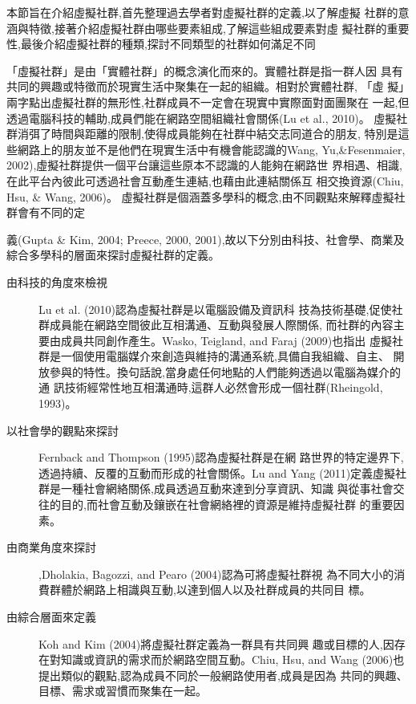 


本節旨在介紹虛擬社群,首先整理過去學者對虛擬社群的定義,以了解虛擬
社群的意涵與特徵,接著介紹虛擬社群由哪些要素組成,了解這些組成要素對虛
擬社群的重要性,最後介紹虛擬社群的種類,探討不同類型的社群如何滿足不同


「虛擬社群」是由「實體社群」的概念演化而來的。實體社群是指一群人因
具有共同的興趣或特徵而於現實生活中聚集在一起的組織。相對於實體社群,
「虛
擬」兩字點出虛擬社群的無形性,社群成員不一定會在現實中實際面對面團聚在
一起,但透過電腦科技的輔助,成員們能在網路空間組織社會關係(Lu et al., 2010)。
虛擬社群消弭了時間與距離的限制,使得成員能夠在社群中結交志同道合的朋友,
特別是這些網路上的朋友並不是他們在現實生活中有機會能認識的Wang, Yu,\&Fesenmaier, 2002),虛擬社群提供一個平台讓這些原本不認識的人能夠在網路世
界相遇、相識,在此平台內彼此可透過社會互動產生連結,也藉由此連結關係互
相交換資源(Chiu, Hsu, \& Wang, 2006)。
虛擬社群是個涵蓋多學科的概念,由不同觀點來解釋虛擬社群會有不同的定


義(Gupta \& Kim, 2004; Preece, 2000, 2001),故以下分別由科技、社會學、商業及
綜合多學科的層面來探討虛擬社群的定義。

\begin{description}
\item[由科技的角度來檢視] Lu et al. (2010)認為虛擬社群是以電腦設備及資訊科
技為技術基礎,促使社群成員能在網路空間彼此互相溝通、互動與發展人際關係,
而社群的內容主要由成員共同創作產生。Wasko, Teigland, and Faraj (2009)也指出
虛擬社群是一個使用電腦媒介來創造與維持的溝通系統,具備自我組織、自主、
開放參與的特性。換句話說,當身處任何地點的人們能夠透過以電腦為媒介的通
訊技術經常性地互相溝通時,這群人必然會形成一個社群(Rheingold, 1993)。
\item[以社會學的觀點來探討] Fernback and Thompson (1995)認為虛擬社群是在網
路世界的特定邊界下,透過持續、反覆的互動而形成的社會關係。Lu and Yang
(2011)定義虛擬社群是一種社會網絡關係,成員透過互動來達到分享資訊、知識
與從事社會交往的目的,而社會互動及鑲嵌在社會網絡裡的資源是維持虛擬社群
的重要因素。
\item[由商業角度來探討] ,Dholakia, Bagozzi, and Pearo (2004)認為可將虛擬社群視
為不同大小的消費群體於網路上相識與互動,以達到個人以及社群成員的共同目
標。
\item[由綜合層面來定義] Koh and Kim (2004)將虛擬社群定義為一群具有共同興
趣或目標的人,因存在對知識或資訊的需求而於網路空間互動。Chiu, Hsu, and
Wang (2006)也提出類似的觀點,認為成員不同於一般網路使用者,成員是因為
共同的興趣、目標、需求或習慣而聚集在一起。

\end{description}

